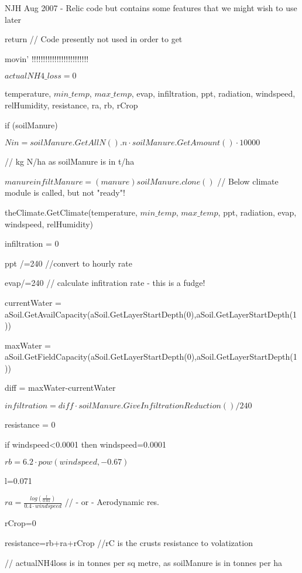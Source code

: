 \documentclass[%
]{scrartcl}
\begin{document}
{{{NJH Aug 2007 - Relic code but contains some features that we might wish to use later

   return  // Code presently not used in order to get
   
    movin' !!!!!!!!!!!!!!!!!!!!!!!!!

	$  actualNH4\_loss=0$
	
  temperature, $min\_temp$, $max\_temp$, evap, infiltration, ppt, radiation,
                     windspeed, relHumidity, resistance, ra, rb, rCrop
  
 if (soilManure)
  
   	  $Nin = soilManure.GetAllN().n \cdot soilManure.GetAmount() \cdot 10000$ 

// kg N/ha as soilManure is in t/ha
     
$ manure  infiltManure = (manure  ) soilManure.clone()$      
      // Below climate module is called, but not "ready"!
      
      theClimate.GetClimate(temperature, $min\_temp$, $max\_temp$, ppt, radiation, evap, windspeed, relHumidity)
      
      infiltration = 0
      
      ppt /=240  //convert to hourly rate
    
       evap/=240  // calculate infitration rate - this is a fudge!
      
        currentWater = aSoil.GetAvailCapacity(aSoil.GetLayerStartDepth(0),aSoil.GetLayerStartDepth(1))
        
        maxWater = aSoil.GetFieldCapacity(aSoil.GetLayerStartDepth(0),aSoil.GetLayerStartDepth(1))
        
        diff = maxWater-currentWater
     
     $ infiltration = diff  \cdot  soilManure.GiveInfiltrationReduction()/240$

        resistance = 0
        
      if windspeed<0.0001 then windspeed=0.0001
     
     $ rb=6.2 \cdot pow(windspeed,-0.67)$ \citep[Eq. 16]{sommer2000modelling}

     
   l=0.071
    
$  ra=\tfrac{log(\tfrac{l}{0.01})}{0.4 \cdot windspeed}$ 
// - or -   Aerodynamic res.
     
 rCrop=0
    
 resistance=rb+ra+rCrop            
  //rC is the crusts resistance to volatization

 // actualNH4loss is in tonnes per sq metre, as soilManure is in tonnes per ha
    
}}}
\end{document}
